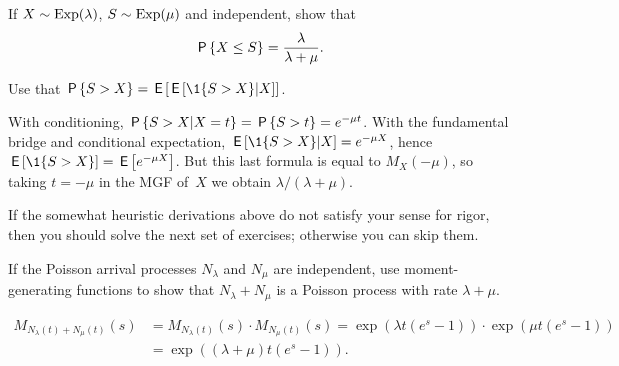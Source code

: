 \documentclass[queueing-book.tex]{subfiles}
\begin{document}
\begin{exercise}\label{ex:3}
 If  
$X\sim \Exp{\lambda}$, $S\sim\Exp{\mu}$  and independent, show that
 \begin{equation*}
 \P{X\leq S} = \frac{\lambda}{\lambda+\mu}.
 \end{equation*}
\begin{hint}
Use that $\P{S > X} = \E{\E{\1{S>X}|X}}$.
\end{hint}
\begin{solution}
With conditioning, $\P{S>X|X=t} = \P{S>t} =e^{-\mu t}$.
With the fundamental bridge and conditional expectation, $\E{\1{S>X}|X} = e^{-\mu X}$, hence $\E{\1{S>X}} = \E{e^{-\mu X}}$. But this last formula is equal to
$M_{X}(-\mu)$, so taking $t=-\mu$ in the MGF of~$X$ we obtain $\lambda/(\lambda+\mu)$.
\end{solution}
\end{exercise}


If the somewhat heuristic derivations above do not satisfy your sense for rigor, then you should solve the next set of exercises; otherwise you can skip them.


\begin{exercise}\label{ex:41}
 If the Poisson arrival processes $N_\lambda$ and $N_\mu$ are independent, use moment-generating functions to show that $N_\lambda + N_\mu$ is a Poisson process with rate $\lambda + \mu$.
\begin{solution}
\begin{align*}
M_{N_\lambda(t)+N_\mu(t)}(s)
&= M_{N_\lambda(t)}(s)\cdot M_{N_{\mu}(t)}(s)
=\exp(\lambda t (e^s -1))\cdot \exp(\mu t(e^s-1)) \\
&= \exp((\lambda + \mu)t (e^s-1)).
\end{align*}
\end{solution}
\end{exercise}
\end{document}
